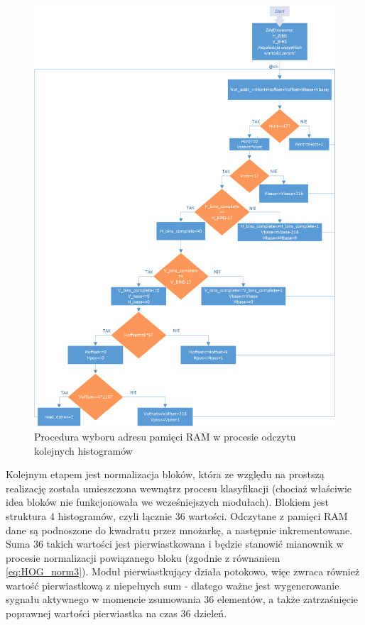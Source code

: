 \begin{figure}[!ht]
	\centering
	\includegraphics[width=16cm]{4_HOG_Features.png}
	\caption{Procedura wyboru adresu pamięci RAM w procesie odczytu kolejnych histogramów}
	\label{fig:hog_feature_histrogram_address}
\end{figure} 

Kolejnym etapem jest normalizacja bloków, która ze względu na prostszą realizację została umieszczona wewnątrz procesu klasyfikacji (chociaż właściwie idea bloków nie funkcjonowała we wcześniejszych modułach). Blokiem jest struktura 4 histogramów, czyli łącznie 36 wartości. Odczytane z pamięci RAM dane są podnoszone do kwadratu przez mnożarkę, a następnie inkrementowane. Suma 36 takich wartości jest pierwiastkowana i będzie stanowić mianownik w procesie normalizacji powiązanego bloku (zgodnie z równaniem \ref{eq:HOG_norm3}). Moduł pierwiastkujący działa potokowo, więc zwraca również wartość pierwiastkową z niepełnych sum - dlatego ważne jest wygenerowanie sygnału aktywnego w momencie zsumowania 36 elementów, a także zatrzaśnięcie poprawnej wartości pierwiastka na czas 36 dzieleń.

